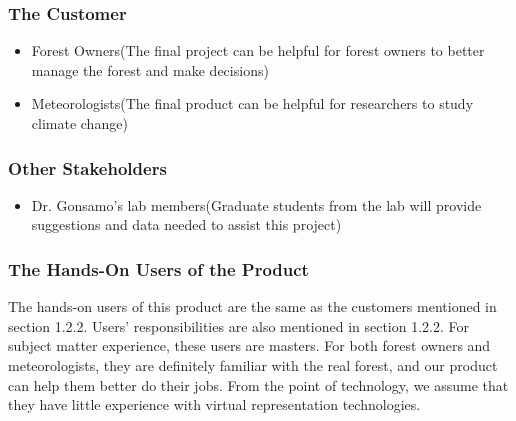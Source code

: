 \documentclass{article}
\begin{document}
\subsubsection{The Customer}
\begin{itemize}
    \item Forest Owners(The final project can be helpful for forest owners to better manage the 
    forest and make decisions)
    \item Meteorologists(The final product can be helpful for researchers to 
    study climate change)
\end{itemize}

\subsubsection{Other Stakeholders}
\begin{itemize}
    \item Dr. Gonsamo's lab members(Graduate students from the lab will provide suggestions and
    data needed to assist this project)
\end{itemize}

\subsubsection{The Hands-On Users of the Product}
The hands-on users of this product are the same as the customers mentioned in section 1.2.2. Users'
responsibilities are also mentioned in section 1.2.2. For subject matter experience, these 
users are masters. For both forest owners and meteorologists, they are definitely
familiar with the real forest, and our product can help them better do
their jobs. From the point of technology, we assume that they 
have little experience with virtual representation
technologies.
\end{document}
